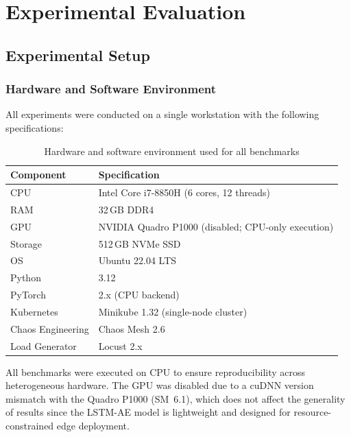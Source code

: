 \chapter{Experimental Evaluation}
\label{ch:evaluation}

\section{Experimental Setup}
\label{sec:eval_setup}

\subsection{Hardware and Software Environment}
\label{subsec:eval_hardware}

All experiments were conducted on a single workstation with the following
specifications:

\begin{table}[H]
    \centering
    \begin{tabular}{|l|l|}
        \hline
        \textbf{Component} & \textbf{Specification} \\
        \hline
        CPU & Intel Core i7-8850H (6 cores, 12 threads) \\
        \hline
        RAM & 32\,GB DDR4 \\
        \hline
        GPU & NVIDIA Quadro P1000 (disabled; CPU-only execution) \\
        \hline
        Storage & 512\,GB NVMe SSD \\
        \hline
        OS & Ubuntu 22.04 LTS \\
        \hline
        Python & 3.12 \\
        \hline
        PyTorch & 2.x (CPU backend) \\
        \hline
        Kubernetes & Minikube 1.32 (single-node cluster) \\
        \hline
        Chaos Engineering & Chaos Mesh 2.6 \\
        \hline
        Load Generator & Locust 2.x \\
        \hline
    \end{tabular}
    \caption{Hardware and software environment used for all benchmarks}
    \label{tab:eval_hardware}
\end{table}

All benchmarks were executed on CPU to ensure reproducibility across
heterogeneous hardware. The GPU was disabled due to a cuDNN version mismatch
with the Quadro P1000 (SM~6.1), which does not affect the generality of
results since the LSTM-AE model is lightweight and designed for
resource-constrained edge deployment.

